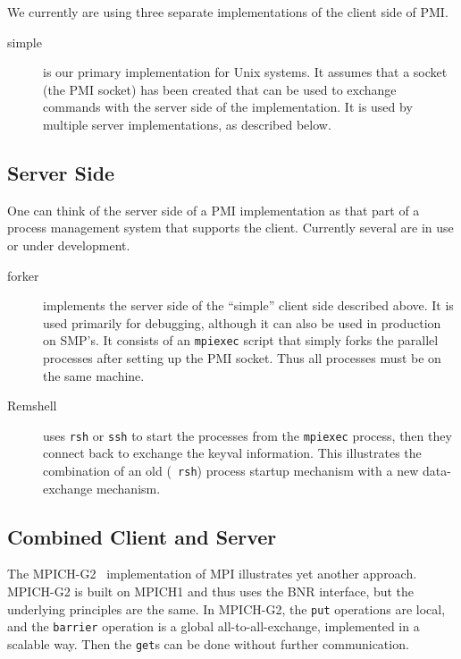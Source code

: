 \documentclass[11pt]{article}
\begin{document}
We currently are using three separate implementations of the client side of PMI.
\begin{description}
\item[simple] is our primary implementation for Unix systems.  It
  assumes that a socket (the PMI socket) has been created that can be
  used to exchange commands with the server side of the implementation.
  It is used by multiple server implementations, as described below.
\end{description}


\subsection{Server Side}
\label{sec:server-side}

One can think of the server side of a PMI implementation as that part of
a process management system that supports the client.  Currently several
are in use or under development.

\begin{description}
\item[forker] implements the server side of the ``simple'' client side
  described above.  It is used primarily for debugging, although it can
  also be used in production on SMP's.  It consists of an {\tt mpiexec}
  script that simply forks the parallel processes after setting up the
  PMI socket.  Thus all processes must be on the same machine.
\item[Remshell] uses {\tt rsh} or {\tt ssh} to start the processes from
  the {\tt mpiexec} process, then they connect back to exchange the
  keyval information.  This illustrates the combination of an old ({\tt
    rsh}) process startup mechanism with a new data-exchange mechanism.
\end{description}

\subsection{Combined Client and Server}
\label{sec:combined}

The MPICH-G2~\cite{karonis02:mpich-g2} implementation of MPI illustrates
yet another approach.  MPICH-G2 is built on MPICH1 and thus uses the BNR
interface, but the underlying principles are the same.  In MPICH-G2, the
{\tt put} operations are local, and the {\tt barrier} operation is a
global all-to-all-exchange, implemented in a scalable way.  Then the
{\tt get}s can be done without further communication. 
\end{document}
